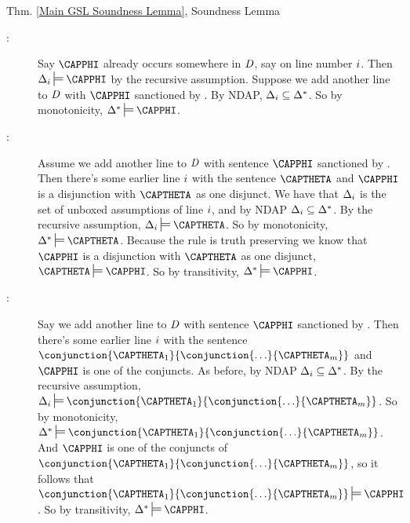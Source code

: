 \begin{PROOFOF}{Thm. \ref{Main GSL Soundness Lemma}, Soundness Lemma}
\begin{description}
\begin{description}
\item[:] 
Say $\CAPPHI$ already occurs somewhere in $\mathit{D}$, say on line number $i$. 
Then $\Delta_{\integer{i}}\sdtstile{}{}\CAPPHI$ by the recursive assumption. 
Suppose we add another line to $\mathit{D}$ with $\CAPPHI$ sanctioned by . 
By NDAP, $\Delta_{i}\subseteq\Delta^*$. 
So by monotonicity, $\Delta^*\sdtstile{}{}\CAPPHI$.

\item[:]
Assume we add another line to $\mathit{D}$ with sentence $\CAPPHI$ sanctioned by . 
Then there's some earlier line $i$ with the sentence $\CAPTHETA$ and $\CAPPHI$ is a disjunction with $\CAPTHETA$ as one disjunct. 
We have that $\Delta_{i}$ is the set of unboxed assumptions of line $i$, and by NDAP $\Delta_{i}\subseteq\Delta^*$.
By the recursive assumption, $\Delta_{\integer{i}}\sdtstile{}{}\CAPTHETA$.
So by monotonicity, $\Delta^*\sdtstile{}{}\CAPTHETA$.
Because the rule is truth preserving we know that $\CAPPHI$ is a disjunction with $\CAPTHETA$ as one disjunct, $\CAPTHETA\sdtstile{}{}\CAPPHI$. 
So by transitivity, $\Delta^*\sdtstile{}{}\CAPPHI$. 

\item[:]
Say we add another line to $\mathit{D}$ with sentence $\CAPPHI$ sanctioned by .
Then there's some earlier line $i$ with the sentence $\conjunction{\CAPTHETA_\integer{1}}{\conjunction{\ldots}{\CAPTHETA_{\integer{m}}}}$ and $\CAPPHI$ is one of the conjuncts. 
As before, by NDAP $\Delta_{i}\subseteq\Delta^*$.
By the recursive assumption, $\Delta_{\integer{i}}\sdtstile{}{}\conjunction{\CAPTHETA_\integer{1}}{\conjunction{\ldots}{\CAPTHETA_{\integer{m}}}}$. 
So by monotonicity, $\Delta^*\sdtstile{}{}\conjunction{\CAPTHETA_\integer{1}}{\conjunction{\ldots}{\CAPTHETA_{\integer{m}}}}$.
And $\CAPPHI$ is one of the conjuncts of $\conjunction{\CAPTHETA_\integer{1}}{\conjunction{\ldots}{\CAPTHETA_{\integer{m}}}}$, so it follows that $\conjunction{\CAPTHETA_\integer{1}}{\conjunction{\ldots}{\CAPTHETA_{\integer{m}}}}\sdtstile{}{}\CAPPHI$. 
So by transitivity, $\Delta^*\sdtstile{}{}\CAPPHI$.


\end{description}
\end{description}
\end{PROOFOF}
